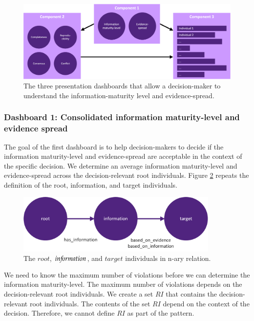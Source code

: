 \begin{figure}[H]
\centering
  \includegraphics[width=16cm]{../../Images/04_Contribution/04_Presentation_Components.png}
  \caption{The three presentation dashboards that allow a decision-maker to understand the information-maturity level and evidence-spread.}
  \label{fig:04_Presentation_Components}
\end{figure} 

\subsubsection{Dashboard 1: Consolidated information maturity-level and evidence spread} \label{odp_maturity_evidence_spread}
The goal of the first dashboard is to help decision-makers to decide if the information maturity-level and evidence-spread are acceptable in the context of the specific decision. We determine an average information maturity-level and evidence-spread across the decision-relevant root individuals. Figure \ref{fig:root_information_target_1} repeats the definition of the root, information, and target individuals.

\begin{figure}[H]
\centering
  \includegraphics[width=10cm]{../../Images/04_Contribution/04_root_information_target.png}
  \caption{The $root$, $in{\mkern-2mu f\mkern-3mu}ormation$, and $target$ individuals in n-ary relation.}
  \label{fig:root_information_target_1}
\end{figure}

We need to know the maximum number of violations before we can determine the information maturity-level. The maximum number of violations depends on the decision-relevant root individuals. We create a set $RI$ that contains the decision-relevant root individuals. The contents of the set $RI$ depend on the context of the decision. Therefore, we cannot define $RI$ as part of the pattern.  

